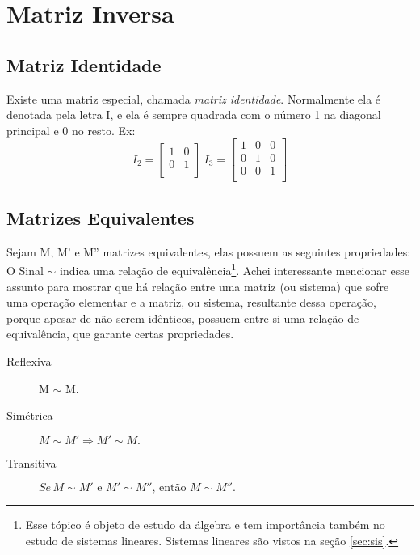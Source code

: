 \section{Matriz Inversa}
\subsection{Matriz Identidade}
Existe uma matriz especial, chamada \textit{matriz identidade}. Normalmente ela é denotada pela letra I, e ela é sempre quadrada com o número 1 na diagonal principal e 0 no resto. Ex:
\begin{displaymath}
I_2=
\begin{bmatrix}
1 & 0 \\
0 & 1 \\
\end{bmatrix}
\: I_3=
\begin{bmatrix}
1 & 0 & 0 \\ 0 & 1 & 0 \\ 0 & 0 & 1\\
\end{bmatrix}
\end{displaymath}
\subsection{Matrizes Equivalentes}
 Sejam M, M' e M'' matrizes equivalentes, elas possuem as seguintes propriedades:\\
O Sinal $\sim$ indica uma relação de equivalência\footnote{Esse tópico é objeto de estudo da álgebra e tem importância também no estudo de sistemas lineares. Sistemas lineares são vistos na seção \ref{sec:sis}.}. Achei interessante mencionar esse assunto para mostrar que há relação entre uma matriz (ou sistema) que sofre uma operação elementar e a matriz, ou sistema, resultante dessa operação, porque apesar de não serem idênticos, possuem entre si uma relação de equivalência, que garante certas propriedades.
\begin{description}
  \item[Reflexiva] M $\sim$ M.
  \item[Simétrica] $M\sim M'\Rightarrow M'\sim M.$
  \item[Transitiva]$Se\,  M\sim M'\text{ e }M'\sim M''\text{, então }M\sim M''.$
\end{description}
